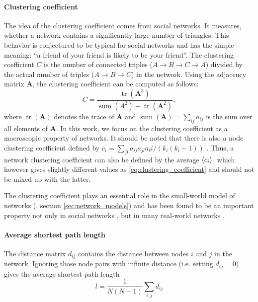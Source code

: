 \paragraph{Clustering coefficient\color{Cayenne}{.}}
The idea of the clustering coefficient comes from social networks.
It measures, whether a network contains a significantly large number of triangles.
This behavior is conjectured to be typical for social networks and has the simple meaning:
``a friend of your friend is likely to be your friend''.
The clustering coefficient $C$ is the number of connected triples ($A\rightarrow B \rightarrow C \rightarrow A$) divided by the actual number of triples ($A\rightarrow B \rightarrow C $) in the network.
Using the adjacency matrix $\mathbf{A}$, the clustering coefficient can be computed as follows:
\begin{equation}\label{eq:clustering_coefficient}
C=\frac{\operatorname{tr}(\mathbf{A}^3)}{\operatorname{sum} (A^2) -\operatorname{tr}(\mathbf{A}^2)},
\end{equation}
where $\operatorname{tr}(\mathbf{A} )$ denotes the trace of $\mathbf{A}$ and $\operatorname{sum} (\mathbf{A})=\sum _{ij} a_{ij}$ is the sum over all elements of $\mathbf{A}$.
In this work, we focus on the clustering coefficient as a macroscopic property of networks.
It should be noted that there is also a node clustering coefficient defined by $c_i=\sum _{jl} a_{ij}a_{jl}a_li/(k_i (k_i -1))$ \citep{Watts:1998,dynamical_processes}.
Thus, a network clustering coefficient can also be defined by the average $\left< c_i \right>$, which however gives slightly different values as \eqref{eq:clustering_coefficient} and should not be mixed up with the latter.


The clustering coefficient plays an essential role in the small-world model of networks (\citep{Watts:1998}, section \ref{sec:network_models}) and has been found to be an important property not only in social networks \citep{Holland1971}, but in many real-world networks \citep{Newman2003}.

\paragraph{Average shortest path length\color{Cayenne}{.}}
The distance matrix $d_{ij}$ contains the distance between nodes $i$ and $j$ in the network.
Ignoring those node pairs with infinite distance (i.e. setting $d_{ij}=0$) gives the average shortest path length
\begin{equation}\label{eq:}
l=\frac{1}{N(N-1)}\sum _{i, j} d_{ij}
\end{equation}

